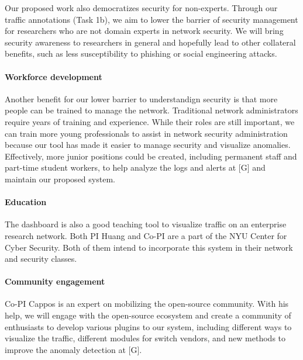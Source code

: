 Our proposed work also democratizes security for non-experts. Through our traffic annotations (Task 1b), we aim to lower the barrier of security management for researchers who are not domain experts in network security. We will bring security awareness to researchers in general and hopefully lead to other collateral benefits, such as less susceptibility to phishing or social engineering attacks.


\paragraph{Workforce development}
Another benefit for our lower barrier to understandign security is that more people can be trained to manage the network. Traditional network administrators require years of training and experience. While their roles are still important, we can train more young professionals to assist in network security administration because our tool has made it easier to manage security and visualize anomalies. Effectively, more junior positions could be created, including permanent staff and part-time student workers, to help analyze the logs and alerts at [G] and maintain our proposed system.

\paragraph{Education}
The dashboard is also a good teaching tool to visualize traffic on an enterprise research network. Both PI Huang and Co-PI are a part of the NYU Center for Cyber Security. Both of them intend to incorporate this system in their network and security classes.

\paragraph{Community engagement}
Co-PI Cappos is an expert on mobilizing the open-source community. With his help, we will engage with the open-source ecosystem and create a community of enthusiasts to develop various plugins to our system, including different ways to visualize the traffic, different modules for switch vendors, and new methods to improve the anomaly detection at [G].


